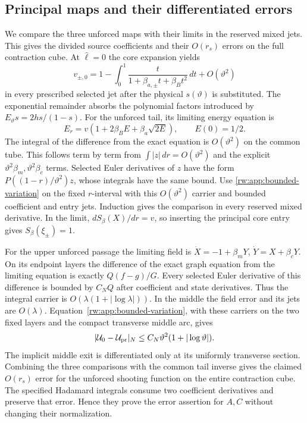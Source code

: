 \subsection{Principal maps and their differentiated errors}
\label{rw:app:source-principal}

We compare the three unforced maps with their limits in the reserved
mixed jets. This gives the divided source coefficients and their
$O(r_s)$ errors on the full contraction cube.
At $\widehat\ell=0$ the core expansion yields
\[
 v_{\pm,0}=1-\int_0^1
       \frac{t}{1+\beta_{a,\pm}t+\beta_Bt^2}\,dt+O(\vartheta^2)
\]
in every prescribed selected jet after the physical $s(\vartheta)$
is substituted. The exponential remainder absorbs the polynomial
factors introduced by $E_\vartheta s=2hs/(1-s)$.
For the unforced tail, its limiting energy equation is
\[
 E_r=v(1+2\beta_BE+\beta_a\sqrt{2E}),\qquad E(0)=1/2.
\]
The integral of the difference from the exact equation is
$O(\vartheta^2)$ on the common tube. This follows term by term
from $\int|z|\,dr=O(\vartheta^2)$ and the explicit
$\vartheta^2\beta_m,\vartheta^2\beta_c$ terms. Selected
Euler derivatives of $z$ have the form $P((1-r)/\vartheta^2)z$,
whose integrals have the same bound. Use
\eqref{rw:app:bounded-variation} on the fixed $r$-interval with this
$O(\vartheta^2)$ carrier and bounded coefficient and entry jets.
Induction gives the comparison in every reserved mixed derivative.
In the limit, $dS_\beta(X)/dr=v$, so inserting the
principal core entry gives $S_\beta(\xi_\pm)=1$.

For the upper unforced passage the limiting field is
$\dot X=-1+\beta_mY$, $\dot Y=X+\beta_cY$.
On its endpoint layers the difference of the exact graph equation
from the limiting equation is exactly $Q(f-g)/G$.
Every selected Euler derivative of this difference is bounded by
$C_NQ$ after coefficient and state derivatives. Thus the integral
carrier is $O(\lambda(1+|\log\lambda|))$.
In the middle the field error and its jets are $O(\lambda)$.
Equation~\eqref{rw:app:bounded-variation}, with these carriers on the
two fixed layers and the compact transverse middle arc, gives
\[
 |\mathcal U_0-\mathcal U_{\rm pr}|_N
             \le C_N\vartheta^2(1+|\log\vartheta|).
\]
The implicit middle exit is differentiated only at its uniformly
transverse section. Combining the three comparisons with the common
tail inverse gives the claimed $O(r_s)$ error for the unforced
shooting function on the entire contraction cube. The specified
Hadamard integrals consume two coefficient derivatives and preserve
that error. Hence they prove the error assertion for $A,C$ without
changing their normalization.

